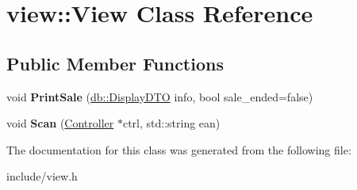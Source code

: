 \hypertarget{classview_1_1View}{}\section{view\+:\+:View Class Reference}
\label{classview_1_1View}
\subsection*{Public Member Functions}
\begin{DoxyCompactItemize}
\item 
\mbox{\label{classview_1_1View_a795b23c83aca0baf42d5b3f8629b7924}} 
void {\bfseries Print\+Sale} (\mbox{\hyperlink{classdb_1_1DisplayDTO}{db\+::\+Display\+D\+TO}} info, bool sale\+\_\+ended=false)
\item 
\mbox{\label{classview_1_1View_a598acfd586c702317300a17d8dcfd5fd}} 
void {\bfseries Scan} (\mbox{\hyperlink{classController}{Controller}} $\ast$ctrl, std\+::string ean)
\end{DoxyCompactItemize}


The documentation for this class was generated from the following file\+:\begin{DoxyCompactItemize}
\item 
include/view.\+h\end{DoxyCompactItemize}

